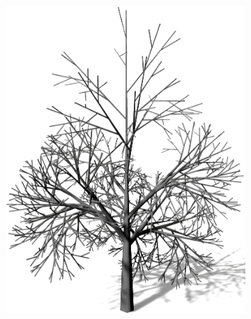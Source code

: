 \begin{figure} [hbtp]
	\centering
	\begin{subfigure}[t]{.45\textwidth}
		\centering
		\includegraphics[width=\linewidth]{images/LS_Monopodial_1.png}
		\caption{}
		\label{subfig:LS_Monopodial_1}
	\end{subfigure}
	\begin{subfigure}[t]{.45\textwidth}
		\centering

\end{subfigure}
\end{figure}
